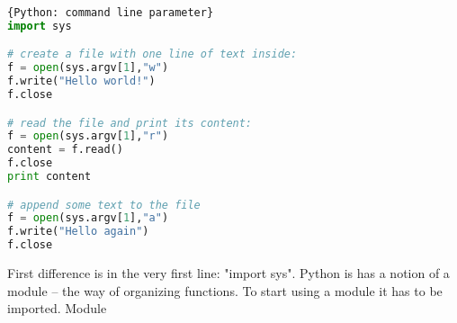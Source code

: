 \begin{lstlisting}[language=Python,style=codelst]{Python: command line parameter}
import sys

# create a file with one line of text inside:
f = open(sys.argv[1],"w")
f.write("Hello world!")
f.close

# read the file and print its content:
f = open(sys.argv[1],"r")
content = f.read()
f.close
print content

# append some text to the file
f = open(sys.argv[1],"a")
f.write("Hello again")
f.close

\end{lstlisting}

First difference is in the very first line: "import sys".
Python is has a notion of a module -- the way of organizing
functions. To start using a module it has to be imported.
Module













